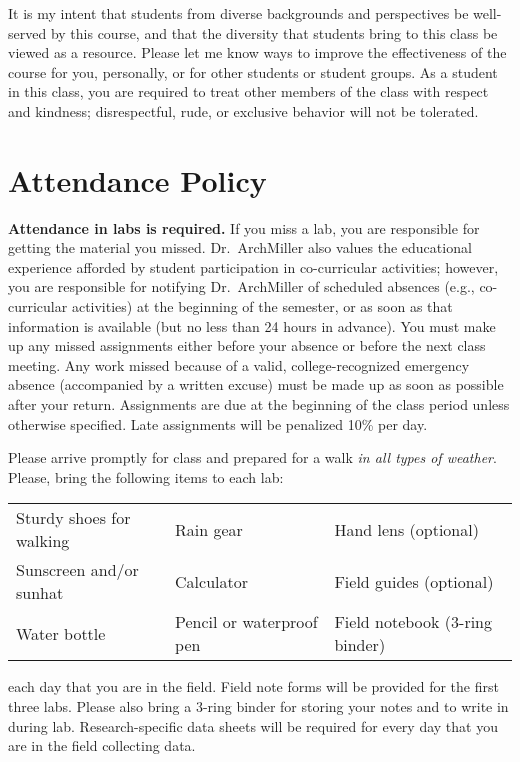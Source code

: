 \documentclass{tufte-handout}
\begin{document}
\begin{fullwidth}
It is my intent that students from diverse backgrounds and perspectives be well-served by this course, and that the diversity that students bring to this class be viewed as a resource. Please let me know ways to improve the effectiveness of the course for you, personally, or for other students or student groups. As a student in this class, you are required to treat other members of the class with respect and kindness; disrespectful, rude, or exclusive behavior will not be tolerated.

\section{Attendance Policy}

\textbf{Attendance in labs is required.} If you miss a lab, you are responsible for getting the material you missed. Dr.~ArchMiller also values the educational experience afforded by student participation in co-curricular activities; however, you are responsible for notifying Dr.~ArchMiller of scheduled absences (e.g., co-curricular activities) at the beginning of the semester, or as soon as that information is available (but no less than 24 hours in advance). You must make up any missed assignments either before your absence or before the next class meeting. Any work missed because of a valid, college-recognized emergency absence (accompanied by a written excuse) must be made up as soon as possible after your return. Assignments are due at the beginning of the class period unless otherwise specified. Late assignments will be penalized 10\% per day.

 Please arrive promptly for class and prepared for a walk \emph{in all types of weather}. Please, bring the following items to each lab:

\begin{tabular}{lll}
Sturdy shoes for walking & Rain gear & Hand lens (optional)\\
Sunscreen and/or sunhat & Calculator & Field guides (optional)\\
Water bottle & Pencil or waterproof pen & Field notebook (3-ring binder)
\end{tabular}


 each day that you are in the field. Field note forms will be provided for the first three labs. Please also bring a 3-ring binder for storing your notes and to write in during lab. Research-specific data sheets will be required for every day that you are in the field collecting data. 


\end{fullwidth}
\end{document}
